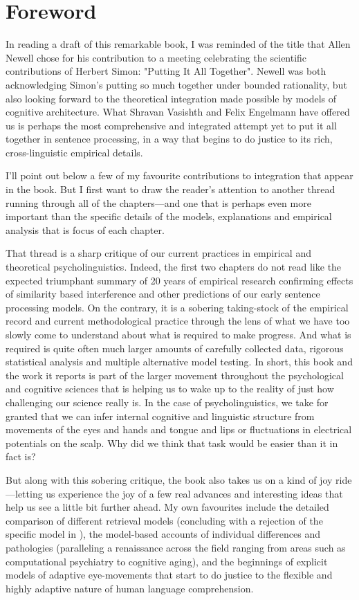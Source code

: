\chapter*{Foreword}

In reading a draft of this remarkable book, I was reminded of the title
that Allen Newell chose for his contribution to a meeting celebrating
the scientific contributions of Herbert Simon: "Putting It All
Together".  Newell was both acknowledging Simon's putting so much
together under bounded rationality, but also looking forward to the
theoretical integration made possible by models of cognitive
architecture.  What Shravan Vasishth and Felix Engelmann have offered us
is perhaps the most comprehensive and integrated attempt yet to put it
all together in sentence processing, in a way that begins to do justice
to its rich, cross-linguistic empirical details.

I'll point out below a few of my favourite contributions to integration
that appear in the book.  But I first want to draw the reader's
attention to another thread running through all of the chapters---and
one that is perhaps even more important than the specific details of the
models, explanations and empirical analysis that is focus of each
chapter.

That thread is a sharp critique of our current practices in empirical
and theoretical psycholinguistics.  Indeed, the first two chapters do
not read like the expected triumphant summary of 20 years of empirical
research confirming effects of similarity based interference and other
predictions of our early sentence processing models. On the contrary, it
is a sobering taking-stock of the empirical record and current
methodological practice through the lens of what we have too slowly come
to understand about what is required to make progress.  And what is
required is quite often much larger amounts of carefully collected data,
rigorous statistical analysis and multiple alternative model testing. In
short, this book and the work it reports is part of the larger movement
throughout the psychological and cognitive sciences that is helping us
to wake up to the reality of just how challenging our science really is.
In the case of psycholinguistics, we take for granted that we can infer
internal cognitive and linguistic structure from movements of the eyes
and hands and tongue and lips or fluctuations in electrical potentials
on the scalp. Why did we think that task would be easier than it in fact
is?

But along with this sobering critique, the book also takes us on a kind
of joy ride---letting us experience the joy of a few real advances and
interesting ideas that help us see a little bit further ahead. My own
favourites include the detailed comparison of different retrieval models
(concluding with a rejection of the specific model in \cite{LewisVasishth2005}), the model-based accounts of individual differences and
pathologies (paralleling a renaissance across the field  ranging from
areas such as computational psychiatry to cognitive aging), and the
beginnings of explicit models of adaptive eye-movements that start to do
justice to the flexible and highly adaptive nature of human language
comprehension.

